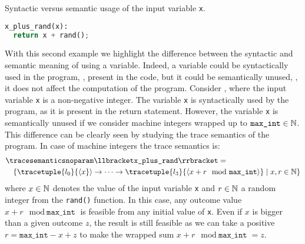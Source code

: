 \begin{example}
  \begin{marginlisting}[*1]
    \caption{Syntactic versus semantic usage of the input variable \texttt{x}.}
    \vspace{2\lineheight}
  \begin{lstlisting}[language=Python]
x_plus_rand(x):
  return x + rand();
 \end{lstlisting}
  \end{marginlisting}
With this second example we highlight the difference between the syntactic and semantic meaning of using a variable. Indeed, a variable could be syntactically used in the program, \ie, present in the code, but it could be semantically unused, \ie, it does not affect the computation of the program.
Consider , where the input variable \texttt{x} is a non-negative integer.
The variable \texttt{x} is syntactically used by the program, as it is present in the return statement.
However, the variable \texttt{x} is semantically unused if we consider machine integers wrapped up to $\texttt{max\_int}\in\mathbb{N}$.
This difference can be clearly seen by studying the trace semantics of the program. In case of machine integers the trace semantics is:
\begin{align*}
  &\tracesemanticsnoparam\semanticsof{\texttt{x\_plus\_rand}}
  =\\
  &\quad\setdef{
    \tracetuple{\locinit}{\langle{x}}\rangle\tracearrow\tracetuple{\loc{3}}{\langle{x+r \mod \texttt{max\_int}}\rangle}
  }{x, r \in \N}
\end{align*}
where $x\in\mathbb{N}$ denotes the value of the input variable \texttt{x} and $r\in\mathbb{N}$ a random integer from the \texttt{rand()} function.
In this case, any outcome value $x+r \mod \texttt{max\_int}$ is feasible from any initial value of \texttt{x}.
Even if $x$ is bigger than a given outcome $z$, the result is still feasible as we can take a positive $r = \texttt{max\_int} - x + z$ to make the wrapped sum $x + r \mod \texttt{max\_int} = z$.


\end{example}
